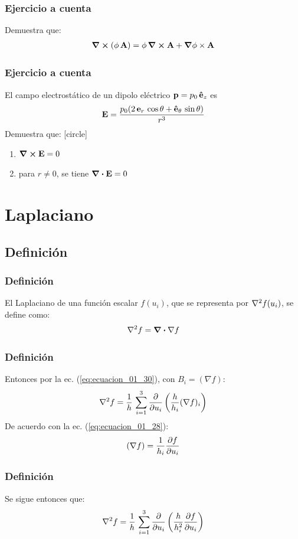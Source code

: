 \documentclass[12pt]{beamer}
\begin{document}
\begin{frame}
\frametitle{Ejercicio a cuenta}
Demuestra que:
\begin{align*}
\curl(\phi \, \vb{A}) = \phi \, \curl{\vb{A}} + \grad{\phi} \times \vb{A}
\end{align*}
\end{frame}
\begin{frame}
\frametitle{Ejercicio a cuenta}
El campo electrostático de un dipolo eléctrico $\vb{p} = p_{0} \, \vu{e}_{z}$ es
\begin{align*}
\vb{E} = \dfrac{p_{0} (2 \, \vb{e}_{r} \, \cos \theta + \vu{e}_{\theta} \, \sin \theta)}{r^{3}}
\end{align*}
Demuestra que:
[circle]
\begin{enumerate}
\item $\curl{\vb{E}} = 0$
\item para $r \neq 0$, se tiene $\div{\vb{E}} = 0$
\end{enumerate}
\end{frame}
\section{Laplaciano}
\subsection{Definición}
\begin{frame}
\frametitle{Definición}
El Laplaciano de una función escalar $f(u_{i})$, que se representa por $\laplacian{f(u_{i})}$, se define como:
\begin{align*}
\laplacian{f} = \div{\nabla f}
\end{align*}
\end{frame}
\begin{frame}
\frametitle{Definición}
Entonces por la ec. (\ref{eq:ecuacion_01_30}), con $B_{i} = (\nabla f)$:
\begin{align*}
\laplacian{f} = \dfrac{1}{h} \, \sum_{i=1}^{3} \pdv{u_{i}} \left( \dfrac{h}{h_{i}}  (\nabla f)_{i} \right)
\end{align*}
\pause
De acuerdo con la ec. (\ref{eq:ecuacion_01_28}):
\begin{align*}
(\nabla f) = \dfrac{1}{h_{i}} \pdv{f}{u_{i}}
\end{align*}
\end{frame}
\begin{frame}
\frametitle{Definición}
Se sigue entonces que:
\begin{align}
\laplacian{f} = \dfrac{1}{h} \, \sum_{i=1}^{3} \pdv{u_{i}} \left( \dfrac{h}{h_{i}^{2}}  \pdv{f}{u_{i}} \right)
\label{eq:ecuacion_01_36}
\end{align}
\end{frame}
\end{document}
